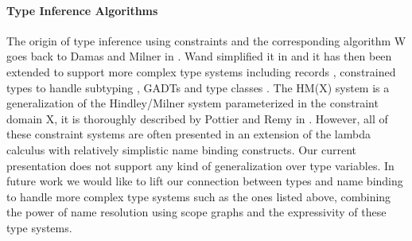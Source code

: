 % 
% 
% 
% 
% 
% 
% 
% 
% 
% 
% 

\paragraph{Type Inference Algorithms} The origin of type inference using
constraints and the corresponding algorithm W goes back to Damas and Milner in
\cite{Milner78:0,DamasM82}. Wand simplified it in  \cite{Wand87a} and it has
then been extended to support more complex type systems including records
\cite{Remy92:0}, constrained types to handle subtyping
 \cite{TrifonovS96}, GADTs \cite{SimonetP07,SchrijversJSV09} and
type classes \cite{VytiniotisJSS11}.
The HM(X) system \cite{OderskySW99} is a generalization of the Hindley/Milner
system parameterized in the constraint domain X, it is thoroughly described by
Pottier and Remy in \cite{Pottier-Remy/emlti}.
However, all of these constraint systems are often presented in an extension of
the lambda calculus with relatively simplistic name binding constructs.
Our current presentation does not support any kind of generalization over type
variables. In future work we would like to lift our connection between types and
name binding to handle more complex type systems such as the ones listed above,
combining the power of name resolution using scope graphs and the expressivity
of these type systems.

% 
% 
